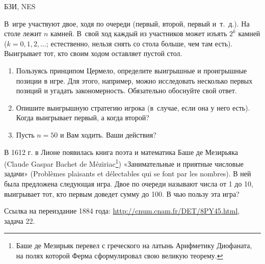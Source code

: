 \begin{problem}
\begin{source}
БЗИ, NES
\end{source} В~игре участвуют двое, ходя
по очереди (первый, второй, первый и~т.~д.). На столе лежит
$n$ камней. В~свой ход каждый из участников может изъять
$2^k$ камней ($k=0,1,2,\ldots$; естественно, нельзя снять
со стола больше, чем там есть). Выигрывает тот, кто своим
ходом оставляет пустой стол.

\begin{enumerate}

\item Пользуясь принципом Цермело, определите выигрышные и
проигрышные позиции в игре. Для этого, например, можно
исследовать несколько первых позиций и угадать
закономерность. Обязательно обоснуйте свой ответ.

\item Опишите выигрышную стратегию игрока (в~случае, если
она у него есть). Когда выигрывает первый, а когда второй?


\item Пусть $n=50$ и Вам ходить. Ваши действия?

\end{enumerate}







\begin{sol}

\end{sol}
\end{problem}




\begin{problem}
В 1612 г. в Лионе появилась книга поэта и математика Баше де Мезирьяка (Claude Gaspar Bachet de M\'eziriac\footnote{Баше де Мезирьяк перевел с греческого на латынь Арифметику Диофаната, на полях которой Ферма сформулировал свою великую теорему.}) «Занимательные и приятные числовые задачи» (Probl\`emes plaisants et d\'electables qui se font par les nombres). В ней была предложена следующая игра. Двое по очереди называют числа от 1 до 10, выигрывает тот, кто первым доведет сумму до 100. В чью пользу эта игра?\par
Ссылка на переиздание 1884 года: \url{http://cnum.cnam.fr/DET/8PY45.html}, задача 22.



\begin{sol}

\end{sol}
\end{problem}


